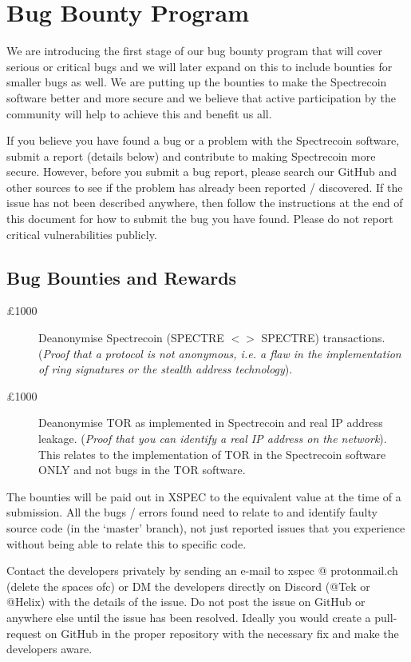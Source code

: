 \section{Bug Bounty Program}
We are introducing the first stage of our bug bounty program that will cover
serious or critical bugs and we will later expand on this to include bounties
for smaller bugs as well. We are putting up the bounties to make the
Spectrecoin software better and more secure and we believe that active
participation by the community will help to achieve this and benefit us all.



If you believe you have found a bug or a problem with the Spectrecoin
software, submit a report (details below) and contribute to making
Spectrecoin more secure. However, before you submit a bug report, please
search our GitHub and other sources to see if the problem has already
been reported / discovered. If the issue has not been described anywhere,
then follow the instructions at the end of this document for how to submit
the bug you have found. Please do not report critical vulnerabilities
publicly.



\subsection{Bug Bounties and Rewards}
\begin{description}
	\item[£1000] Deanonymise Spectrecoin (SPECTRE $<>$ SPECTRE)
	transactions. (\textit{Proof that a protocol is not anonymous,
	i.e. a flaw in the implementation of ring signatures or the stealth
	address technology}).
	\item[£1000] Deanonymise TOR as implemented in Spectrecoin and real
	IP address leakage. (\textit{Proof that you can identify a real IP
	address on the network}). This relates to the implementation of TOR
	in the Spectrecoin software ONLY and not bugs in the TOR software.
\end{description}



The bounties will be paid out in XSPEC to the equivalent value at the time
of a submission. All the bugs / errors found need to relate to and identify
faulty source code (in the ‘master’ branch), not just reported issues that
you experience without being able to relate this to specific code.



Contact the developers privately by sending an e-mail to xspec @ protonmail.ch
(delete the spaces ofc) or DM the developers directly on Discord (@Tek or
@Helix) with the details of the issue. Do not post the issue on GitHub or
anywhere else until the issue has been resolved. Ideally you would create
a pull-request on GitHub in the proper repository with the necessary fix
and make the developers aware.
